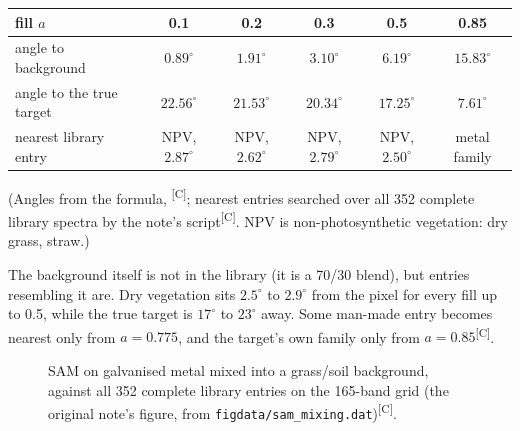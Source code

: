 \documentclass[11pt,a4paper,oneside,openany]{book}
\newcommand{\comp}{\textsuperscript{\textsf{\scriptsize[C]}}}
\begin{document}
\begin{center}\small
\begin{tabular}{@{}lccccc@{}}
\toprule
fill $a$ & 0.1 & 0.2 & 0.3 & 0.5 & 0.85\\
\midrule
angle to background & $0.89^\circ$ & $1.91^\circ$ & $3.10^\circ$ & $6.19^\circ$ & $15.83^\circ$\\
angle to the true target & $22.56^\circ$ & $21.53^\circ$ & $20.34^\circ$ & $17.25^\circ$ & $7.61^\circ$\\
nearest library entry & NPV, $2.87^\circ$ & NPV, $2.62^\circ$ & NPV, $2.79^\circ$ & NPV, $2.50^\circ$ & metal family\\
\bottomrule
\end{tabular}
\end{center}
(Angles from the formula, \comp; nearest entries searched over all 352 complete library spectra by the note's script\comp.
NPV is non-photosynthetic vegetation: dry grass, straw.)

The background itself is not in the library (it is a 70/30 blend), but entries resembling it are. Dry vegetation sits $2.5^\circ$ to $2.9^\circ$ from the
pixel for every fill up to 0.5, while the true target is $17^\circ$ to $23^\circ$ away. Some man-made entry becomes nearest only from $a=0.775$, and the target's
own family only from $a=0.85$\comp.

\begin{figure}[ht]
\centering
{}
\caption{SAM on galvanised metal mixed into a grass/soil background, against all 352 complete library entries on the 165-band grid (the original
note's figure, from \texttt{figdata/sam\_mixing.dat})\comp.}
\label{fig:sam}
\end{figure}
\end{document}
